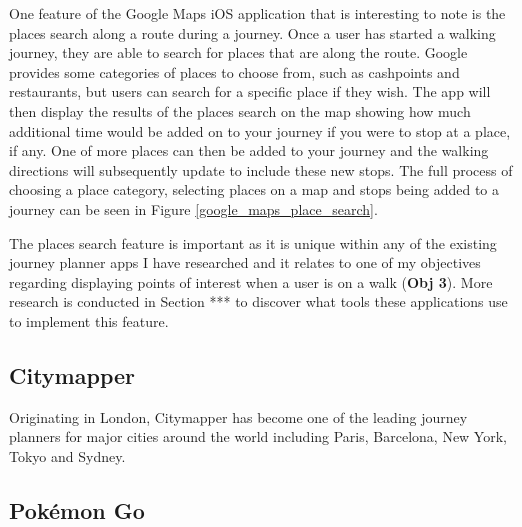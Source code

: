 One feature of the Google Maps iOS application that is interesting to note is the places search along a route during a journey. Once a user has started a walking journey, they are able to search for places that are along the route. Google provides some categories of places to choose from, such as cashpoints and restaurants, but users can search for a specific place if they wish. The app will then display the results of the places search on the map showing how much additional time would be added on to your journey if you were to stop at a place, if any. One of more places can then be added to your journey and the walking directions will subsequently update to include these new stops. The full process of choosing a place category, selecting places on a map and stops being added to a journey can be seen in Figure \ref{google_maps_place_search}.

The places search feature is important as it is unique within any of the existing journey planner apps I have researched and it relates to one of my objectives regarding displaying points of interest when a user is on a walk (\textbf{Obj 3}). More research is conducted in Section *** to discover what tools these applications use to implement this feature.

\subsection{Citymapper}

Originating in London, Citymapper \cite{Citymapper} has become one of the leading journey planners for major cities around the world including Paris, Barcelona, New York, Tokyo and Sydney. 

\subsection{Pok\'{e}mon Go}







